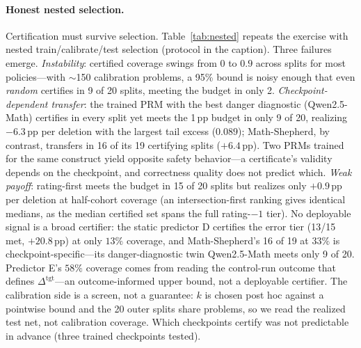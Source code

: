 \documentclass[11pt]{article}
\begin{document}
\paragraph{Honest nested selection.}
Certification must survive selection. Table~\ref{tab:nested} repeats the exercise with nested train/calibrate/test selection (protocol in the caption). Three failures emerge. \emph{Instability}: certified coverage swings from 0 to $0.9$ across splits for most policies---with $\sim$150 calibration problems, a 95\% bound is noisy enough that even \emph{random} certifies in 9 of 20 splits, meeting the budget in only 2. \emph{Checkpoint-dependent transfer}: the trained PRM with the best danger diagnostic (Qwen2.5-Math) certifies in every split yet meets the 1\,pp budget in only 9 of 20, realizing $\mathbf{-6.3}$\,pp per deletion with the largest tail excess ($0.089$); Math-Shepherd, by contrast, transfers in 16 of its 19 certifying splits ($+6.4$\,pp). Two PRMs trained for the same construct yield opposite safety behavior---a certificate's validity depends on the checkpoint, and correctness quality does not predict which. \emph{Weak payoff}: rating-first meets the budget in 15 of 20 splits but realizes only $+0.9$\,pp per deletion at half-cohort coverage (an intersection-first ranking gives identical medians, as the median certified set spans the full rating-$-1$ tier). No deployable signal is a broad certifier: the static predictor D certifies the error tier (13/15 met, $+20.8$\,pp) at only $13\%$ coverage, and Math-Shepherd's 16 of 19 at $33\%$ is checkpoint-specific---its danger-diagnostic twin Qwen2.5-Math meets only 9 of 20. Predictor E's $58\%$ coverage comes from reading the control-run outcome that defines $\Delta^{\mathrm{tgt}}$---an outcome-informed upper bound, not a deployable certifier. The calibration side is a screen, not a guarantee: $k$ is chosen post hoc against a pointwise bound and the 20 outer splits share problems, so we read the realized test net, not calibration coverage. Which checkpoints certify was not predictable in advance (three trained checkpoints tested).
\end{document}
